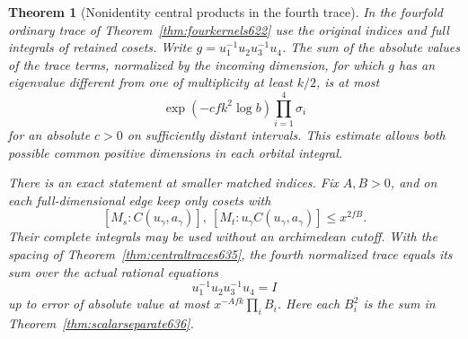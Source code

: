 \documentclass[a4paper,11pt]{article}
\newtheorem{theorem}[proposition]{Theorem}
\theoremstyle{definition}
\theoremstyle{remark}
\numberwithin{equation}{section}
\begin{document}
\begin{theorem}[Nonidentity central products in the fourth trace]
\leavevmode\label{thm:centralfour636}
In the fourfold ordinary trace of Theorem~\ref{thm:fourkernels622}
use the original indices and full integrals of retained cosets.
Write \(g=u_1^{-1}u_2u_3^{-1}u_4\). The sum of the absolute values
of the trace terms, normalized by the incoming dimension, for which
\(g\) has an eigenvalue different from one of multiplicity at
least \(k/2\), is at most
\[
          \exp(-c f k^2\log b)\prod_{i=1}^4 \sigma_i
\]
for an absolute \(c>0\) on sufficiently distant intervals. This
estimate allows both possible common positive dimensions in each
orbital integral.

There is an exact statement at smaller matched indices. Fix
\(A,B>0\), and on each full-dimensional edge keep only cosets with
\[
           [M_s:C(u_\gamma,a_\gamma)],\
           [M_t:u_\gamma C(u_\gamma,a_\gamma)]\le x^{2fB}.
\]
Their complete integrals may be used without an archimedean cutoff.
With the spacing of Theorem~\ref{thm:centraltraces635}, the fourth
normalized trace equals its sum over the actual rational equations
\[
                       u_1^{-1}u_2u_3^{-1}u_4=I
\]
up to error of absolute value at most \(x^{-Afk}\prod_i B_i\).
Here each \(B_i^2\) is the sum in Theorem~\ref{thm:scalarseparate636}.
\end{theorem}
\end{document}
